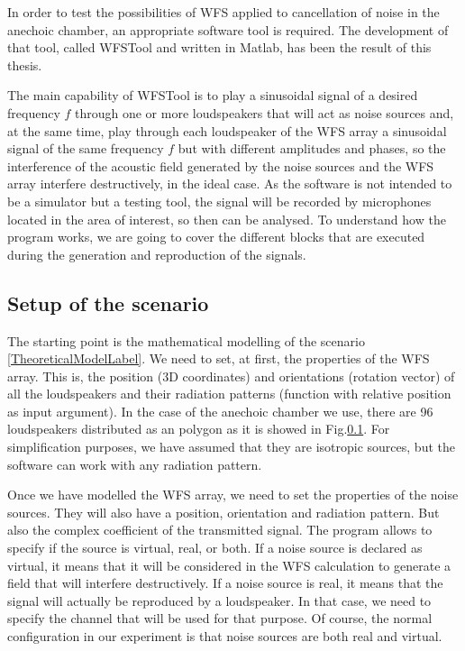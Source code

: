 In order to test the possibilities of WFS applied to cancellation of noise in the anechoic chamber, an appropriate software tool is required. The development of that tool, called WFSTool and written in Matlab, has been the result of this thesis.


The main capability of WFSTool is to play a sinusoidal signal of a desired frequency $f$ through one or more loudspeakers that will act as noise sources and, at the same time, play through each loudspeaker of the WFS array a sinusoidal signal of the same frequency $f$ but with different amplitudes and phases, so the interference of the acoustic field generated by the noise sources and the WFS array interfere destructively, in the ideal case. As the software is not intended to be a simulator but a testing tool, the signal will be recorded by microphones located in the area of interest, so then can be analysed. To understand how the program works, we are going to cover the different blocks that are executed during the generation and reproduction of the signals. 

\subsection{Setup of the scenario}
The starting point is the mathematical modelling of the scenario \ref{TheoreticalModelLabel}. We need to set, at first, the properties of the WFS array. This is, the position (3D coordinates) and orientations (rotation vector) of all the loudspeakers and their radiation patterns (function with relative position as input argument). In the case of the anechoic chamber we use, there are 96 loudspeakers distributed as an polygon as it is showed in Fig.\ref{}. For simplification purposes, we have assumed that they are isotropic sources, but the software can work with any radiation pattern.

Once we have modelled the WFS array, we need to set the properties of the noise sources. They will also have a position, orientation and radiation pattern. But also the complex coefficient of the transmitted signal. The program allows to specify if the source is virtual, real, or both. If a noise source is declared as virtual, it means that it will be considered in the WFS calculation to generate a field that will interfere destructively. If a noise source is real, it means that the signal will actually be reproduced by a loudspeaker. In that case, we need to specify the channel that will be used for that purpose. Of course, the normal configuration in our experiment is that noise sources are both real and virtual.

